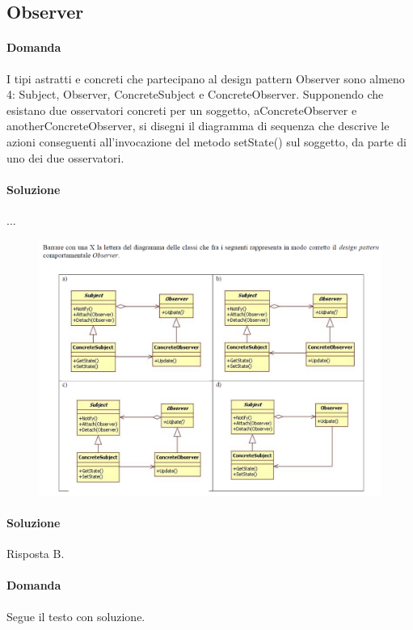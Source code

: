 \subsection{Observer}

\paragraph{Domanda}

I tipi astratti e concreti che partecipano al design pattern Observer sono almeno 4: Subject, Observer, ConcreteSubject e ConcreteObserver. Supponendo che esistano due osservatori concreti per un soggetto, aConcreteObserver e anotherConcreteObserver, si disegni il diagramma di sequenza che descrive le azioni conseguenti all'invocazione del metodo setState() sul soggetto, da parte di uno dei due osservatori.

\paragraph{Soluzione} ...

\begin{figure}[H]\center
\includegraphics[width=1\textwidth]{res/img/Esercizi/es-observer}
\end{figure}

\paragraph{Soluzione} Risposta B.

\paragraph{Domanda} Segue il testo con soluzione.

